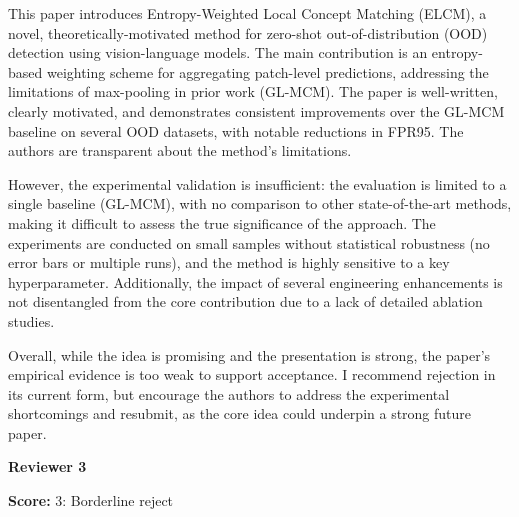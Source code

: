 \begin{tcolorbox}[
    colback=white,
    colframe=black!70,
    title=Reviewer Comments,
    breakable=true,
    fonttitle=\bfseries
]
This paper introduces Entropy-Weighted Local Concept Matching (ELCM), a novel, theoretically-motivated method for zero-shot out-of-distribution (OOD) detection using vision-language models. The main contribution is an entropy-based weighting scheme for aggregating patch-level predictions, addressing the limitations of max-pooling in prior work (GL-MCM). The paper is well-written, clearly motivated, and demonstrates consistent improvements over the GL-MCM baseline on several OOD datasets, with notable reductions in FPR95. The authors are transparent about the method's limitations.

However, the experimental validation is insufficient: the evaluation is limited to a single baseline (GL-MCM), with no comparison to other state-of-the-art methods, making it difficult to assess the true significance of the approach. The experiments are conducted on small samples without statistical robustness (no error bars or multiple runs), and the method is highly sensitive to a key hyperparameter. Additionally, the impact of several engineering enhancements is not disentangled from the core contribution due to a lack of detailed ablation studies.

Overall, while the idea is promising and the presentation is strong, the paper's empirical evidence is too weak to support acceptance. I recommend rejection in its current form, but encourage the authors to address the experimental shortcomings and resubmit, as the core idea could underpin a strong future paper.

\end{tcolorbox}

\textbf{Reviewer 3}


\begin{tcolorbox}[
    colback=gray!5,
    colframe=gray!60,
    title=Review Score,
    fonttitle=\bfseries
]
\textbf{Score:} 3: Borderline reject
\end{tcolorbox}

